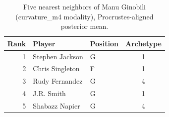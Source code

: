 \begin{table}[htbp]
  \centering\small
  \begin{tabular}{rllc}
    \toprule
    Rank & Player & Position & Archetype \\
    \midrule
    1 & Stephen Jackson & G & 1 \\
    2 & Chris Singleton & F & 1 \\
    3 & Rudy Fernandez & G & 4 \\
    4 & J.R. Smith & G & 1 \\
    5 & Shabazz Napier & G & 4 \\
    \bottomrule
  \end{tabular}
  \caption{Five nearest neighbors of Manu Ginobili (curvature_m4 modality), Procrustes-aligned posterior mean.}
  \label{tab:Manu_Ginobili_neighbors_curvature_m4}
\end{table}

